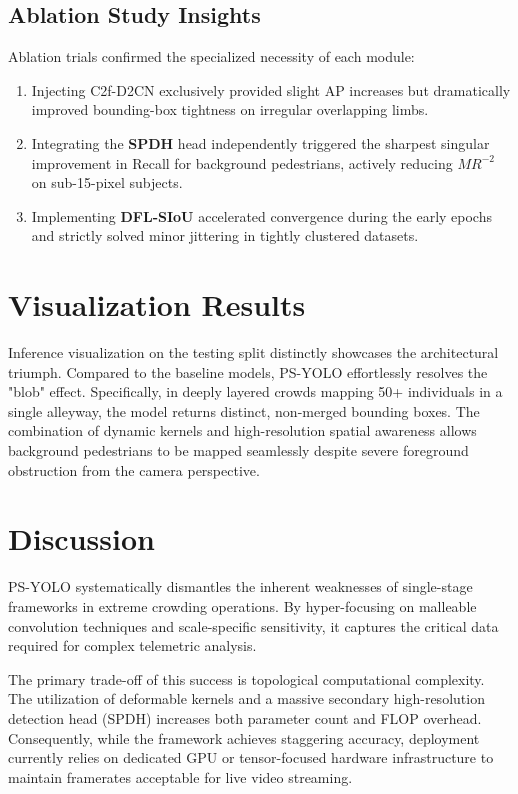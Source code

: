 \documentclass[11pt,a4paper]{article}
\begin{document}
\subsection{Ablation Study Insights}
Ablation trials confirmed the specialized necessity of each module:
\begin{enumerate}
    \item Injecting C2f-D2CN exclusively provided slight AP increases but dramatically improved bounding-box tightness on irregular overlapping limbs.
    \item Integrating the \textbf{SPDH} head independently triggered the sharpest singular improvement in Recall for background pedestrians, actively reducing $MR^{-2}$ on sub-15-pixel subjects.
    \item Implementing \textbf{DFL-SIoU} accelerated convergence during the early epochs and strictly solved minor jittering in tightly clustered datasets. 
\end{enumerate}

\section{Visualization Results}
Inference visualization on the testing split distinctly showcases the architectural triumph. Compared to the baseline models, PS-YOLO effortlessly resolves the "blob" effect. Specifically, in deeply layered crowds mapping 50+ individuals in a single alleyway, the model returns distinct, non-merged bounding boxes. The combination of dynamic kernels and high-resolution spatial awareness allows background pedestrians to be mapped seamlessly despite severe foreground obstruction from the camera perspective.

\section{Discussion}
PS-YOLO systematically dismantles the inherent weaknesses of single-stage frameworks in extreme crowding operations. By hyper-focusing on malleable convolution techniques and scale-specific sensitivity, it captures the critical data required for complex telemetric analysis. 

The primary trade-off of this success is topological computational complexity. The utilization of deformable kernels and a massive secondary high-resolution detection head (SPDH) increases both parameter count and FLOP overhead. Consequently, while the framework achieves staggering accuracy, deployment currently relies on dedicated GPU or tensor-focused hardware infrastructure to maintain framerates acceptable for live video streaming.
\end{document}
